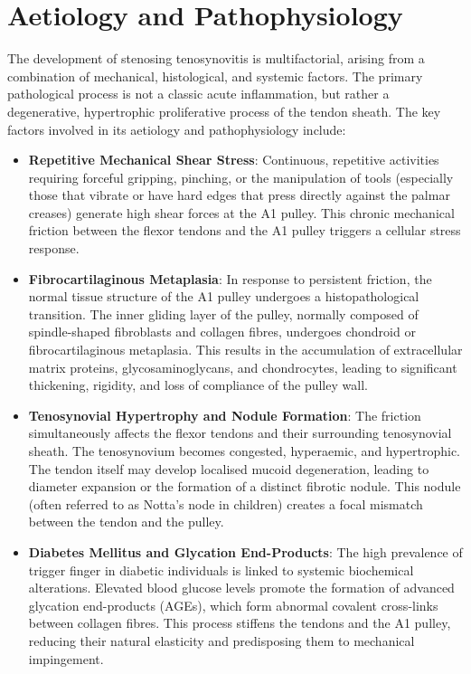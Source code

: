 \section*{Aetiology and Pathophysiology}
The development of stenosing tenosynovitis is multifactorial, arising from a combination of mechanical, histological, and systemic factors. The primary pathological process is not a classic acute inflammation, but rather a degenerative, hypertrophic proliferative process of the tendon sheath. The key factors involved in its aetiology and pathophysiology include:

\begin{itemize}
  \item \textbf{Repetitive Mechanical Shear Stress}: Continuous, repetitive activities requiring forceful gripping, pinching, or the manipulation of tools (especially those that vibrate or have hard edges that press directly against the palmar creases) generate high shear forces at the A1 pulley. This chronic mechanical friction between the flexor tendons and the A1 pulley triggers a cellular stress response.
  \item \textbf{Fibrocartilaginous Metaplasia}: In response to persistent friction, the normal tissue structure of the A1 pulley undergoes a histopathological transition. The inner gliding layer of the pulley, normally composed of spindle-shaped fibroblasts and collagen fibres, undergoes chondroid or fibrocartilaginous metaplasia. This results in the accumulation of extracellular matrix proteins, glycosaminoglycans, and chondrocytes, leading to significant thickening, rigidity, and loss of compliance of the pulley wall.
  \item \textbf{Tenosynovial Hypertrophy and Nodule Formation}: The friction simultaneously affects the flexor tendons and their surrounding tenosynovial sheath. The tenosynovium becomes congested, hyperaemic, and hypertrophic. The tendon itself may develop localised mucoid degeneration, leading to diameter expansion or the formation of a distinct fibrotic nodule. This nodule (often referred to as Notta's node in children) creates a focal mismatch between the tendon and the pulley.
  \item \textbf{Diabetes Mellitus and Glycation End-Products}: The high prevalence of trigger finger in diabetic individuals is linked to systemic biochemical alterations. Elevated blood glucose levels promote the formation of advanced glycation end-products (AGEs), which form abnormal covalent cross-links between collagen fibres. This process stiffens the tendons and the A1 pulley, reducing their natural elasticity and predisposing them to mechanical impingement.

\end{itemize}

